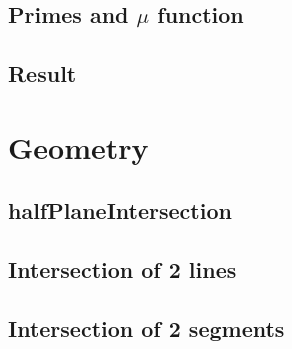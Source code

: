 \documentclass[a4paper,10pt,twocolumn,oneside]{article}
\begin{document}
\subsection{Primes and $\mu$ function}


\subsection{Result}



\section{Geometry}

% 

\subsection{halfPlaneIntersection}
\subsection{Intersection of 2 lines}
% 


% 

% 

\subsection{Intersection of 2 segments}


%

%
\end{document}
